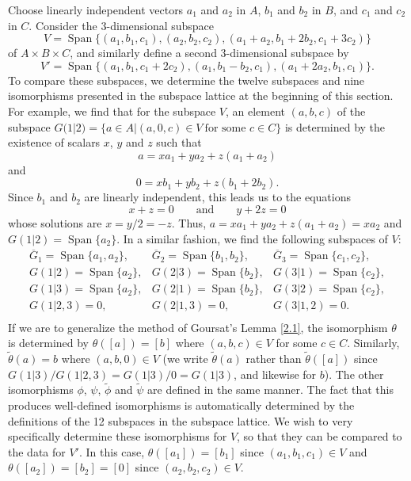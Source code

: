 \documentclass[11pt]{article}
\theoremstyle{change}
\newcommand{\<}{\langle}
\renewcommand{\>}{\rangle}
\begin{document}
Choose linearly independent vectors $a_1$ and $a_2$ in $A$, $b_1$ and $b_2$ in $B$, and $c_1$ and $c_2$ in $C$. Consider the $3$-dimensional subspace
\[ V= {\operatorname{Span}}\{ (a_1, b_1, c_1), (a_2, b_2, c_2), (a_1+a_2, b_1+2b_2, c_1+3c_2)\} \]
 of $A\times B\times C$, and similarly define a second $3$-dimensional 
subspace by
\[ V' = {\operatorname{Span}}\{ (a_1, b_1, c_1+2c_2), (a_1, b_1-b_2, c_1), (a_1+2a_2, b_1, c_1)\}.\]
To compare these subspaces, we determine the twelve subspaces and nine isomorphisms presented in the subspace lattice at the beginning of this section.  For example, we find that for the subspace $V$, an element $(a,b,c)$ of the subspace 
$G(1|2)=\{ a\in A | (a, 0, c) \in V \ \text{for \ some\ } c\in C\}$ is determined by the existence of scalars $x$, $y$ and $z$ such that
\[ a= xa_1+ya_2 + z(a_1+a_2)\]
and
\[ 0=xb_1+yb_2+z(b_1+2b_2).\]
Since $b_1$ and $b_2$ are linearly independent, this leads us to the equations
\[x+z=0 \qquad \text{and} \qquad y+2z=0\]
whose solutions are ${x=y/2= -z}$.  Thus, $a= xa_1+ya_2 + z(a_1+a_2)=xa_2$ and $G(1|2)=\operatorname{Span}\{a_2\}$.
In a similar fashion, we find the following subspaces of $V$:
\[ \begin{array}{ccc}
\overline{G}_1=  \operatorname{Span}\{a_1, a_2\},&\overline{G}_2=   \operatorname{Span}\{b_1, b_2\}, &\overline{G}_3 =   \operatorname{Span}\{c_1, c_2\},\\
G(1|2)=  \operatorname{Span}\{a_2\},&G(2|3)=   \operatorname{Span}\{b_2\},&G(3|1)=   \operatorname{Span}\{c_2\}, \\
G(1|3)=  \operatorname{Span}\{ a_2\},&G(2|1)=   \operatorname{Span}\{b_2\},&G(3|2)=  \operatorname{Span}\{c_2\},  \\
G(1|2,3) =  0,&G(2| 1,3) =  0,&G(3|1,2)= 0.\\
\end{array}
\]
If we are to generalize the method of Goursat's Lemma \ref{2.1}, the isomorphism $\theta$ is determined by $\theta([a])=[b]$ where $(a,b,c)\in V$ for some $c\in C$.  Similarly, $\tilde{\theta}(a)=b$ where $(a,b,0)\in V$ (we write $\tilde{\theta}(a)$ rather than $\tilde{\theta}([a])$ since $G(1|3)/G(1|2,3)=G(1|3)/0=G(1|3)$, and likewise for $b$).  The other isomorphisms $\phi$, $\psi$, $\tilde{\phi}$ and $\tilde{\psi}$ are defined in the same manner.  The fact that this produces well-defined isomorphisms is automatically determined by the definitions of the 12 subspaces in the subspace lattice.  We wish to very specifically determine these isomorphisms for $V$, so that they can be compared to the data for $V'$.    In this case, $\theta([a_1]) = [b_1]$ since $(a_1, b_1, c_1)\in V$ and $\theta([a_2])=[b_2]=[0]$ since $(a_2, b_2, c_2)\in V$.
\end{document}

